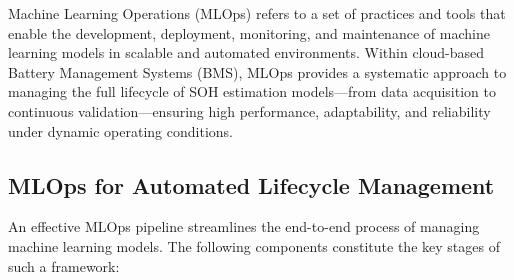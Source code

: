 Machine Learning Operations (MLOps) refers to a set of practices and tools that enable the development, deployment, monitoring, and maintenance of machine learning models in scalable and automated environments. Within cloud-based Battery Management Systems (BMS), MLOps provides a systematic approach to managing the full lifecycle of SOH estimation models—from data acquisition to continuous validation—ensuring high performance, adaptability, and reliability under dynamic operating conditions.

\subsection*{MLOps for Automated Lifecycle Management}

An effective MLOps pipeline streamlines the end-to-end process of managing machine learning models. The following components constitute the key stages of such a framework:

